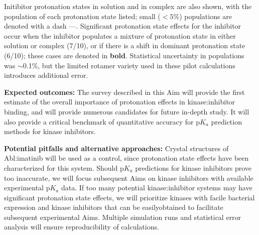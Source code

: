 \documentclass[11pt]{article}
\begin{document}
\begin{table}[H]
{Initibitor protonation states in solution and in complex are also shown, with the population of each protonation state listed; small ($<5\%$) populations are denoted with a dash ---.
Significant protonation state effects for the inhibitor occur when the inhibitor populates a mixture of protonation state in either solution or complex (7/10), or if there is a shift in dominant protonation state (6/10); these cases are denoted in {\bf bold}.
Statistical uncertainty in populations was $\sim$0.1\%, but the limited rotamer variety used in these pilot calculations introduces additional error.
\label{table:mcce-results}
\vspace{-0.2in}
}
\end{table}

{\bf Expected outcomes:}
The survey described in this Aim will provide the first estimate of the overall importance of protonation effects in kinase:inhibitor binding, and will provide numerous candidates for future in-depth study.
It will also provide a critical benchmark of quantitative accuracy for p$K_a$ prediction methods for kinase inhibitors.

{\bf Potential pitfalls and alternative approaches:}
Crystal structures of Abl:imatinib will be used as a control, since protonation state effects have been characterized for this system.
Should p$K_a$ predictions for kinase inhibitors prove too inaccurate, we will focus subsequent Aims on kinase inhibitors with available experimental p$K_a$ data.
If too many potential kinase:inhibitor systems may have significant protonation state effects, we will prioritize kinases with facile bacterial expression and kinase inhibitors that can be easilyobtained to facilitate subsequent experimental Aims.
Multiple simulation runs and statistical error analysis will ensure reproducibility of calculations.



%
\end{document}
